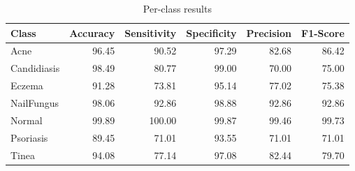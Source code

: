 \begin{table}
\caption{Per-class results}
\label{tab:results}
\begin{tabular}{lrrrrr}
\toprule
Class & Accuracy & Sensitivity & Specificity & Precision & F1-Score \\
\midrule
Acne & 96.45 & 90.52 & 97.29 & 82.68 & 86.42 \\
Candidiasis & 98.49 & 80.77 & 99.00 & 70.00 & 75.00 \\
Eczema & 91.28 & 73.81 & 95.14 & 77.02 & 75.38 \\
NailFungus & 98.06 & 92.86 & 98.88 & 92.86 & 92.86 \\
Normal & 99.89 & 100.00 & 99.87 & 99.46 & 99.73 \\
Psoriasis & 89.45 & 71.01 & 93.55 & 71.01 & 71.01 \\
Tinea & 94.08 & 77.14 & 97.08 & 82.44 & 79.70 \\
\bottomrule
\end{tabular}
\end{table}
